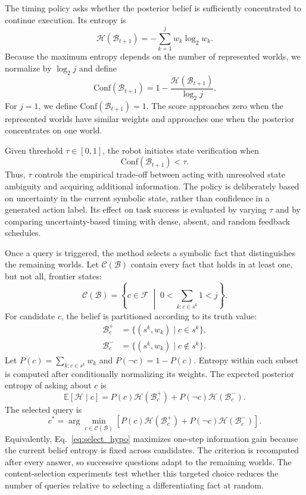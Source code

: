 \label{method:uncertainty}
The timing policy asks whether the posterior belief is sufficiently concentrated to continue execution. Its entropy is
\[
\mathcal{H}(\mathcal{B}_{t+1})
=
-\sum_{k=1}^{j}w_k\log_2 w_k.
\]
Because the maximum entropy depends on the number of represented worlds, we normalize by $\log_2 j$ and define
\begin{equation}
\mathrm{Conf}(\mathcal{B}_{t+1})
=
1-\frac{\mathcal{H}(\mathcal{B}_{t+1})}{\log_2 j}.
\label{eq:compute_confidence}
\end{equation}
For $j=1$, we define $\mathrm{Conf}(\mathcal{B}_{t+1})=1$. The score approaches zero when the represented worlds have similar weights and approaches one when the posterior concentrates on one world.

Given threshold $\tau\in[0,1]$, the robot initiates state verification when
\begin{equation}
\mathrm{Conf}(\mathcal{B}_{t+1})<\tau.
\label{eq:when_query}
\end{equation}
Thus, $\tau$ controls the empirical trade-off between acting with unresolved state ambiguity and acquiring additional information. The policy is deliberately based on uncertainty in the current symbolic state, rather than confidence in a generated action label. Its effect on task success is evaluated by varying $\tau$ and by comparing uncertainty-based timing with dense, absent, and random feedback schedules.

\label{method:query_selection}
Once a query is triggered, the method selects a symbolic fact that distinguishes the remaining worlds. Let $\mathcal{C}(\mathcal{B})$ contain every fact that holds in at least one, but not all, frontier states:
\[
\mathcal{C}(\mathcal{B})
=
\left\{
c\in\mathcal{F}
\;\middle|\;
0<\sum_{k:c\in s^k}1<j
\right\}.
\]
For candidate $c$, the belief is partitioned according to its truth value:
\[
\begin{aligned}
\mathcal{B}_{c}^{+}&=\{(s^k,w_k)\mid c\in s^k\},\\
\mathcal{B}_{c}^{-}&=\{(s^k,w_k)\mid c\notin s^k\}.
\end{aligned}
\]
Let $P(c)=\sum_{k:c\in s^k}w_k$ and $P(\neg c)=1-P(c)$. Entropy within each subset is computed after conditionally normalizing its weights. The expected posterior entropy of asking about $c$ is
\[
\mathbb{E}[\mathcal{H}\mid c]
=
P(c)\mathcal{H}(\mathcal{B}_{c}^{+})
+
P(\neg c)\mathcal{H}(\mathcal{B}_{c}^{-}).
\]
The selected query is
\begin{equation}
c^*
=
\arg\min_{c\in\mathcal{C}(\mathcal{B})}
\left[
P(c)\mathcal{H}(\mathcal{B}_{c}^{+})
+
P(\neg c)\mathcal{H}(\mathcal{B}_{c}^{-})
\right].
\label{eq:select_hypo}
\end{equation}
Equivalently, Eq.~\ref{eq:select_hypo} maximizes one-step information gain because the current belief entropy is fixed across candidates. The criterion is recomputed after every answer, so successive questions adapt to the remaining worlds. The content-selection experiments test whether this targeted choice reduces the number of queries relative to selecting a differentiating fact at random.


